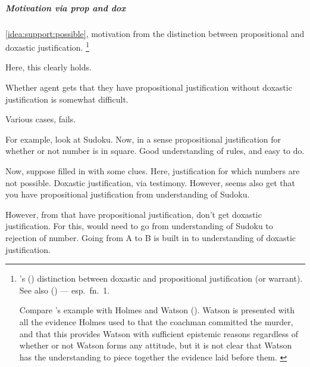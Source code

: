 \subparagraph{Motivation via prop and dox}

\begin{note}
  \autoref{idea:support:possible}, motivation from the distinction between propositional and doxastic justification.%
  \footnote{
    \citeauthor{Firth:1978vi}'s (\citeyear{Firth:1978vi}) distinction between doxastic and propositional justification (or warrant).
    See also \citeauthor{Silva:2020aa} (\citeyear{Silva:2020aa}) --- esp.\ fn.\ 1.

    {\color{red}
      Compare \citeauthor{Firth:1978vi}'s example with Holmes and Watson (\citeyear[218]{Firth:1978vi}).
      Watson is presented with all the evidence Holmes used to that the coachman committed the murder, and that this provides Watson with sufficient epistemic reasons regardless of whether or not Watson forms any attitude, but it is not clear that Watson has the understanding to piece together the evidence laid before them.
    }
  }

  Here, this clearly holds.

  Whether agent gets that they have propositional justification without doxastic justification is somewhat difficult.

  Various cases, fails.

  For example, look at Sudoku.
  Now, in a sense propositional justification for whether or not number is in square.
  Good understanding of rules, and easy to do.

  Now, suppose filled in with some clues.
  Here, justification for which numbers are not possible.
  Doxastic justification, via testimony.
  However, seems also get that you have propositional justification from understanding of Sudoku.

  However, from that have propositional justification, don't get doxastic justification.
  For this, would need to go from understanding of Sudoku to rejection of number.
  Going from A to B is built in to understanding of doxastic justification.
\end{note}

